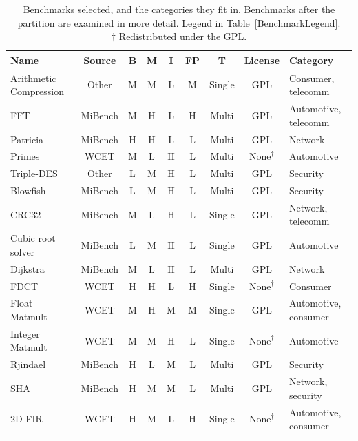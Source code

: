 \documentclass[twocolumn]{article}
\begin{document}
\begin{table}[th!]
\centering
	\begin{tabular}{l c c c c c c c l}
	Name				 	& Source 	& B & M & I & FP& T 		& License & Category \\
	\hline
	Arithmetic Compression	& Other		& M & M & L & M & Single 	& GPL	& Consumer, telecomm	\\
	FFT						& MiBench 	& M & H & L & H & Multi		& GPL	& Automotive, telecomm	\\
	Patricia				& MiBench 	& H & H & L & L & Multi 	& GPL	& Network	\\
	Primes					& WCET 		& M & L & H & L & Multi 	& $\textrm{None}^\dagger$	& Automotive	\\
	Triple-DES				& Other	 	& L & M & H & L & Multi 	& GPL	& Security	\\
	\hline
	Blowfish				& MiBench 	& L & M & H & L & Multi 	& GPL	& Security	\\
	CRC32					& MiBench 	& M & L & H & L & Single 	& GPL	& Network, telecomm	\\
	Cubic root solver		& MiBench 	& L & M & H & L & Single 	& GPL	& Automotive	\\
	Dijkstra				& MiBench 	& M & L & H & L & Multi 	& GPL	& Network	\\
	FDCT					& WCET 		& H & H & L & H & Single 	& $\textrm{None}^\dagger$	& Consumer	\\
	Float Matmult			& WCET 		& M & H & M & M & Single 	& GPL	& Automotive, consumer	\\
	Integer Matmult			& WCET	 	& M & M & H & L & Single 	& $\textrm{None}^\dagger$	& Automotive	\\
	Rjindael				& MiBench 	& H & L & M & L & Multi 	& GPL	& Security	\\
	SHA						& MiBench 	& H & M & M & L & Multi 	& GPL	& Network, security	\\
	2D FIR					& WCET 		& H & M & L & H & Single 	& $\textrm{None}^\dagger$	& Automotive, consumer	\\
	\end{tabular}
\caption{Benchmarks selected, and the categories they fit in. Benchmarks after the partition are examined in more detail. Legend in Table~\ref{BenchmarkLegend}. \\[-0.8em]
 {\null\hfill\scriptsize $\dagger$ Redistributed under the GPL.\hspace{2cm}\null}
 }
\label{Table:BenchmarkTable}
\end{table}
\end{document}
